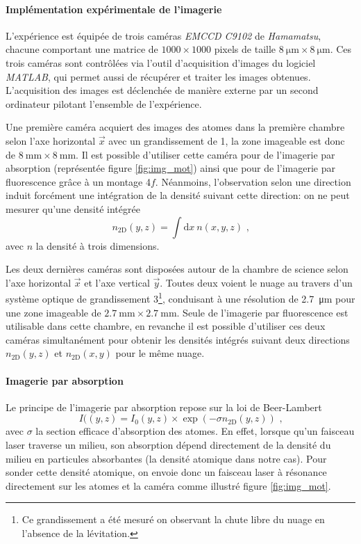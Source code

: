 \paragraph*{Implémentation expérimentale de l'imagerie}
L'expérience est équipée de trois caméras \textit{EMCCD C9102} de \textit{Hamamatsu}, chacune comportant une matrice de $1000 \times 1000$ pixels de taille $\SI{8}{\micro\metre} \times \SI{8}{\micro\metre}$. Ces trois caméras sont contrôlées via l'outil d'acquisition d'images du logiciel \emph{MATLAB}, qui permet aussi de récupérer et traiter les images obtenues. L'acquisition des images est déclenchée de manière externe par un second ordinateur pilotant l'ensemble de l'expérience.

Une première caméra acquiert des images des atomes dans la première chambre selon l'axe horizontal $\vec{x}$ avec un grandissement de 1, la zone imageable est donc de $\SI{8}{\milli\metre} \times \SI{8}{\milli\metre}$. Il est possible d'utiliser cette caméra pour de l'imagerie par absorption (représentée figure \ref{fig:img_mot}) ainsi que pour de l'imagerie par fluorescence grâce à un montage 4$f$. Néanmoins, l'observation selon une direction induit forcément une intégration de la densité suivant cette direction: on ne peut mesurer qu'une densité intégrée
\begin{equation}
n_{\mathrm{2D}}(y,z) =\int{\mathrm{d}x \: n(x,y,z)} \text{ ,}
\end{equation}
avec $n$ la densité à trois dimensions.

Les deux dernières caméras sont disposées autour de la chambre de science selon l'axe horizontal $\vec{x}$ et l'axe vertical $\vec{y}$. Toutes deux voient le nuage au travers d'un système optique de grandissement 3\footnote{Ce grandissement a été mesuré on observant la chute libre du nuage en l'absence de la lévitation.}, conduisant à une résolution de \SI{2.7}{\micro\metre} pour une zone imageable de $\SI{2.7}{\milli\metre} \times \SI{2.7}{\milli\metre}$. Seule de l'imagerie par fluorescence est utilisable dans cette chambre, en revanche il est possible d'utiliser ces deux caméras simultanément pour obtenir les densités intégrés suivant deux directions $n_{\mathrm{2D}}(y,z)$ et $n_{\mathrm{2D}}(x,y)$ pour le même nuage.

\paragraph*{Imagerie par absorption}
Le principe de l'imagerie par absorption repose sur la loi de Beer-Lambert
\begin{equation}
I((y,z)= I_0(y,z) \times \exp{(-\sigma n_{\mathrm{2D}}(y,z))} \text{ ,}
\end{equation}
avec $\sigma$ la section efficace d'absorption des atomes. En effet, lorsque qu'un faisceau laser traverse un milieu, son absorption dépend directement de la densité du milieu en particules absorbantes (la densité atomique dans notre cas). Pour sonder cette densité atomique, on envoie donc un faisceau laser à résonance directement sur les atomes et la caméra comme illustré figure \ref{fig:img_mot}. 

